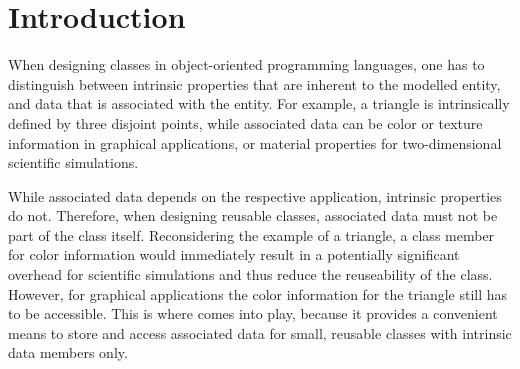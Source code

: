 
\chapter*{Introduction}   

When designing classes in object-oriented programming languages,
one has to distinguish between intrinsic properties that are inherent to the modelled entity,
and data that is associated with the entity. For example, a triangle is intrinsically defined
by three disjoint points, while associated data can be color or texture information in graphical applications, or material properties for two-dimensional scientific simulations.

While associated data depends on the respective application, intrinsic properties do not.
Therefore, when designing reusable classes, associated data must not be part of the class itself.
Reconsidering the example of a triangle, a class member for color information would immediately result in
a potentially significant overhead for scientific simulations and thus reduce the reuseability of the class.
However, for graphical applications the color information for the triangle still has to be accessible. This is where
{\ViennaData} comes into play, because it provides a convenient means to store and access associated data
for small, reusable classes with intrinsic data members only.

